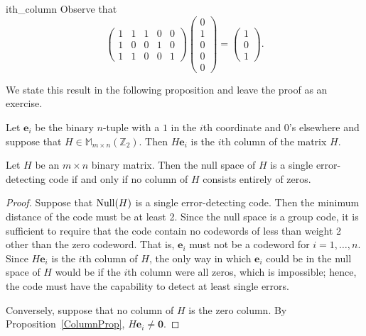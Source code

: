 
\begin{example}{ith_column}
Observe that
\[
\begin{pmatrix}
1 & 1 & 1 & 0 & 0 \\
1 & 0 & 0 & 1 & 0 \\
1 & 1 & 0 & 0 & 1
\end{pmatrix}
\begin{pmatrix}
 0 \\ 1 \\ 0 \\ 0 \\ 0
\end{pmatrix}
=
\begin{pmatrix}
1 \\ 0 \\ 1
\end{pmatrix}.
\]
\end{example}
 
 
We state this result in the following proposition and leave the proof
as an exercise. 
 
\begin{proposition}\label{ColumnProp}
Let ${\mathbf e}_i$ be the binary $n$-tuple with a $1$ in the $i$th
coordinate and $0$'s elsewhere and suppose that $H \in {\mathbb M}_{m
\times n}({\mathbb Z}_2)$. Then $H{\mathbf e}_i$ is the $i$th column of
the matrix $H$.  
\end{proposition}
 
 
\begin{theorem}\label{SingleErrorTheorem}
Let $H$ be an $m \times n$ binary matrix. Then the null space of $H$
is a single error-detecting code if and only if no column of $H$
consists entirely of zeros. 
\end{theorem}
 
 
\begin{proof}
Suppose that ${\rm Null}(H)$ is a single error-detecting code. Then the minimum
distance of the code must be at least 2. Since the null space is a
group code, it is sufficient to require that the code contain no
codewords of less than weight 2 other than the zero codeword. That
is, ${\mathbf e}_i$ must not be a codeword for $i = 1, \ldots, n$. Since
$H{\mathbf e}_i$ is the $i$th column of $H$, the only way in which
${\mathbf e}_i$ could be in the null space of $H$ would be if the $i$th
column were all zeros, which is impossible; hence, the code must have
the capability to detect at least single errors.
 
 
Conversely, suppose that no column of $H$ is the zero column. By 
Proposition~\ref{ColumnProp}, $H{\mathbf e}_i \neq {\mathbf 0}$.
\end{proof}
 
